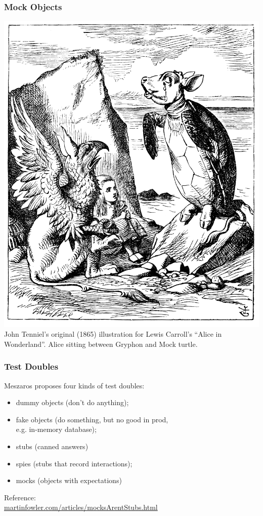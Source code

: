 \documentclass{beamer}
\newenvironment{changemargin}[1]{%
  \begin{list}{}{%
    \setlength{\topsep}{0pt}%
    \setlength{\leftmargin}{#1}%
    \setlength{\rightmargin}{1em}
    \setlength{\listparindent}{\parindent}%
    \setlength{\itemindent}{\parindent}%
    \setlength{\parsep}{\parskip}%
  }%
  \item[]}{\end{list}}
\begin{document}
\begin{frame}
  \frametitle{Mock Objects}
  \begin{center}
    \includegraphics[height=.8\textheight]{L26/Alice_par_John_Tenniel_34.png}\\
John Tenniel's original (1865) illustration for Lewis Carroll's ``Alice in Wonderland''. Alice sitting between Gryphon and Mock turtle.
  \end{center}
\end{frame}

\begin{frame}
  \frametitle{Test Doubles}
  \begin{changemargin}{1cm}
    Meszaros proposes four kinds of test doubles:
    \begin{itemize}
    \item dummy objects (don't do anything);
    \item fake objects (do something, but no good in prod, \\ \hspace*{3cm} e.g. in-memory database);
    \item stubs (canned answers)
    \item spies (stubs that record interactions);
      \item mocks (objects with expectations)
    \end{itemize}
    Reference: \\ \url{martinfowler.com/articles/mocksArentStubs.html}
\end{changemargin}
\end{frame}
\end{document}
